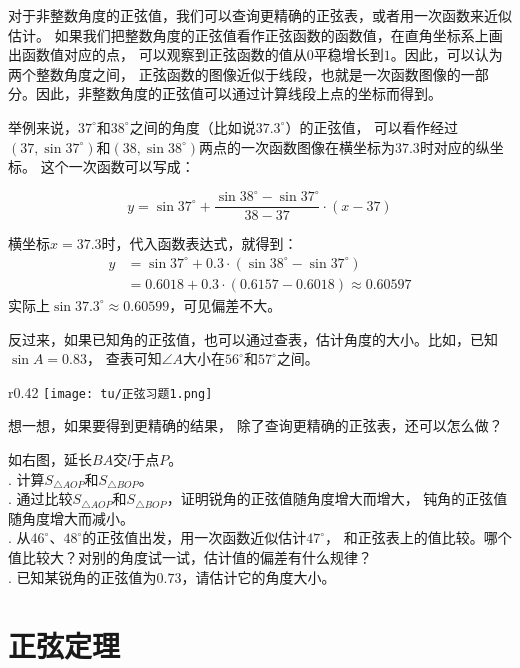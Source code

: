 \documentclass[12pt,UTF8]{ctexbook}
\begin{document}
对于非整数角度的正弦值，我们可以查询更精确的正弦表，或者用一次函数来近似估计。
如果我们把整数角度的正弦值看作正弦函数的函数值，在直角坐标系上画出函数值对应的点，
可以观察到正弦函数的值从$0$平稳增长到$1$。因此，可以认为两个整数角度之间，
正弦函数的图像近似于线段，也就是一次函数图像的一部分。因此，非整数角度的正弦值可以通过计算线段上点的坐标而得到。

举例来说，$37^\circ$和$38^\circ$之间的角度（比如说$37.3^\circ$）的正弦值，
可以看作经过$(37, \sin 37^\circ)$和$(38, \sin 38^\circ)$两点的一次函数图像在横坐标为$37.3$时对应的纵坐标。
这个一次函数可以写成：

$$ y = \sin 37^\circ + \frac{\sin 38^\circ - \sin 37^\circ}{38 - 37} \cdot (x - 37)$$

横坐标$x=37.3$时，代入函数表达式，就得到：
\begin{align*}
    y &= \sin 37^\circ + 0.3\cdot(\sin 38^\circ - \sin 37^\circ )  \\
    &= 0.6018 + 0.3 \cdot (0.6157 - 0.6018) \approx 0.60597 
\end{align*}
实际上$\sin 37.3^\circ \approx 0.60599$，可见偏差不大。

反过来，如果已知角的正弦值，也可以通过查表，估计角度的大小。比如，已知$\sin A = 0.83$，
查表可知$\angle A$大小在$56^\circ$和$57^\circ$之间。

\begin{wrapfigure}[5]{r}{0.42\textwidth} %
    \vspace{-25pt}
    \flushright
    \texttt{[image: tu/正弦习题1.png]}
\end{wrapfigure}

想一想，如果要得到更精确的结果，
除了查询更精确的正弦表，还可以怎么做？

\begin{xt}
    如右图，延长$BA$交$l$于点$P$。\\
    . 计算$S_{\triangle AOP}$和$S_{\triangle BOP}$。 \\
    . 通过比较$S_{\triangle AOP}$和$S_{\triangle BOP}$，证明锐角的正弦值随角度增大而增大，
    钝角的正弦值随角度增大而减小。 \\
    . 从$46^\circ$、$48^\circ$的正弦值出发，用一次函数近似估计$47^\circ$，
    和正弦表上的值比较。哪个值比较大？对别的角度试一试，估计值的偏差有什么规律？ \\
    . 已知某锐角的正弦值为$0.73$，请估计它的角度大小。
\end{xt}

\section{正弦定理}
\end{document}
